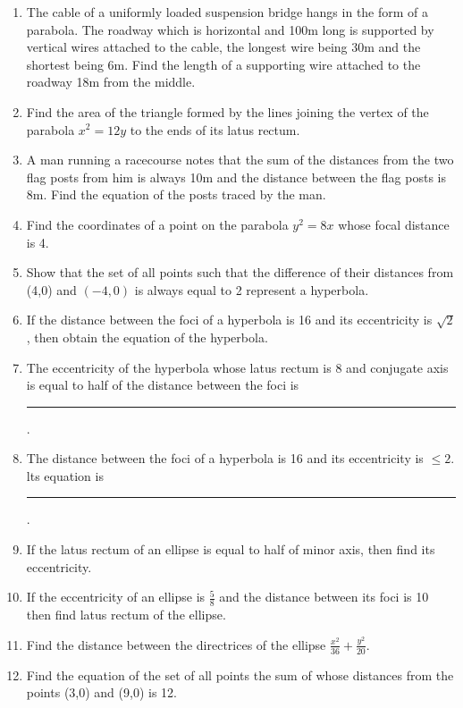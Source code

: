 \begin{enumerate}[label=\thesubsection.\arabic*,ref=\thesubsection.\theenumi]
\item  The cable of a uniformly loaded suspension bridge hangs in the form of a parabola. The roadway which is horizontal and 100m long is supported by vertical wires attached to the cable, the longest wire being 30m and the shortest being 6m. Find the length of a supporting wire attached to the roadway 18m from the middle.
\label{chapters/11/11/5/3}
    \item Find the area of the triangle formed by the lines joining the vertex 
    of the parabola 
        $x^2 = 12y$
    to the ends of its latus rectum.
\label{chapters/11/11/5/6}
\item A man running a racecourse notes that the sum of the distances from the two flag posts from him is always 10m and the distance between the flag posts is 8m. Find the equation of the posts traced by the man. 
\label{chapters/11/11/5/7}
 \item Find the coordinates of a point on the parabola $y^2=8x$ whose focal distance is 4.
\item Show that the set of all points such that the difference of their distances from (4,0) and $(-4,0)$ is always equal to 2 represent a hyperbola.
\item If the distance between the foci of a hyperbola is 16 and its eccentricity is $\sqrt{2}$, then obtain the equation of the hyperbola.
\item The eccentricity of the hyperbola whose latus rectum is 8 and conjugate axis is equal to half of the distance between the foci is \rule{1cm}{0.1pt}.
\item The distance between the foci of a hyperbola is 16 and its eccentricity is $\le{2}$. lts equation is \rule{1cm}{0.1pt}.
 \item If the latus rectum of an ellipse is equal to half of minor axis, then find its eccentricity.
 \item If the eccentricity of an ellipse is $\frac{5}{8}$ and  the distance between its foci is 10 then find latus rectum of the ellipse.
 \item Find the distance between the directrices of the ellipse $\frac{x^2}{36}+\frac{y^2}{20}$.
\item Find the equation of the set of all points the sum of whose distances  from the points (3,0) and (9,0) is 12.

\end{enumerate}

